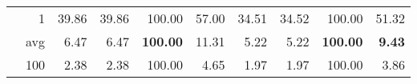 \begin{tabular}{| l | r || r | r | r | r || r | r | r | r |}
    \hline

    & 1   & 39.86          & 39.86           & 100.00          & 57.00          & 34.51          & 34.52           & 100.00          & 51.32         \\
    & avg & 6.47           & 6.47            & \textbf{100.00} & 11.31          & 5.22           & 5.22            & \textbf{100.00} & \textbf{9.43} \\
    & 100 & 2.38           & 2.38            & 100.00          & 4.65           & 1.97           & 1.97            & 100.00          & 3.86          \\

    \hline
\end{tabular}
